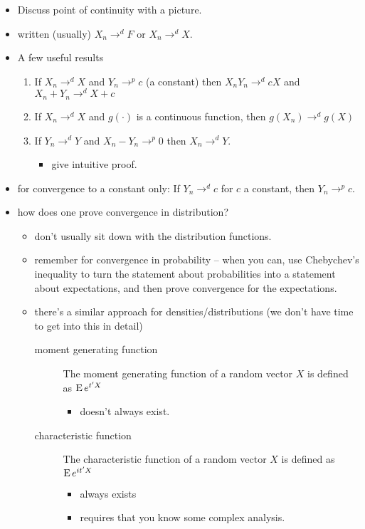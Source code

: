 \begin{itemize}
\item Discuss point of continuity with a picture.
\item written (usually) $X_n →^d F$ or $X_n →^d X$.
\item A few useful results \citep[D.16]{Gre12}
\begin{enumerate}
\item If $X_n →^d X$ and $Y_n →^p c$ (a constant) then
  $X_n Y_n →^d c X$ and $X_n + Y_n →^d X + c$
\item If $X_n →^d X$ and $g(·)$ is a continuous function, then
  $g(X_n) →^d g(X)$
\item If $Y_n →^d Y$ and $X_n - Y_n →^p 0$ then $X_n →^d Y$.
\begin{itemize}
\item give intuitive proof.
\end{itemize}
\end{enumerate}
\item for convergence to a constant only: If $Y_n →^d c$ for $c$ a
  constant, then $Y_n →^p c$.
\item how does one prove convergence in distribution?
\begin{itemize}
\item don't usually sit down with the distribution functions.
\item remember for convergence in probability -- when you can, use
         Chebychev's inequality to turn the statement about
         probabilities into a statement about expectations, and then
         prove convergence for the expectations.
\item there's a similar approach for densities/distributions (we
         don't have time to get into this in detail)
\begin{description}
\item[moment generating function] The moment generating function
  of a random vector $X$ is defined as $\operatorname{E} e^{t'X}$
\begin{itemize}
\item doesn't always exist.
\end{itemize}
\item[characteristic function] The characteristic function of a
  random vector $X$ is defined as $\operatorname{E} e^{it'X}$
\begin{itemize}
\item always exists
\item requires that you know some complex analysis.
\end{itemize}

\end{description}
\end{itemize}
\end{itemize}
